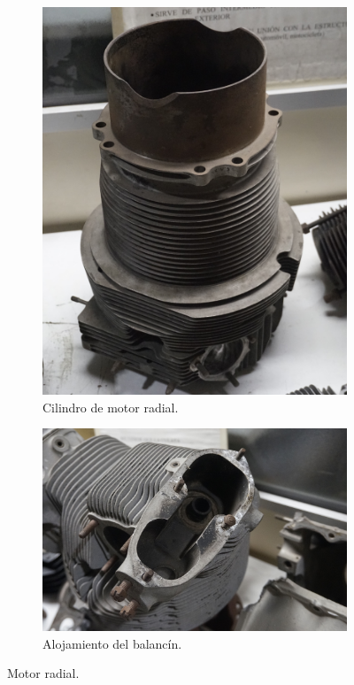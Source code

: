 \begin{figure}[H]
	\centering
	\begin{subfigure}[b]{0.45\textwidth}
		\centering
		\includegraphics[width=\linewidth]{Figures/02/m3/cilindro_radial.jpg}
		\caption{Cilindro de motor radial.}
		\label{fig:cil_rad}
	\end{subfigure}
	\hfill
	\begin{subfigure}[b]{0.45\textwidth}
 		\centering
 		\includegraphics[width=\linewidth]{Figures/02/m3/head_radial.jpg}
 		\caption{Alojamiento del balancín.}
		\label{fig:bal_rad}
	\end{subfigure}    
	\caption{Motor radial.}
	\label{fig:block_radial}
\end{figure}

